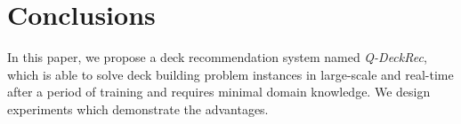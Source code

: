 

\section{Conclusions}\label{sec:conclusion}
In this paper, we propose a deck recommendation system named \textit{Q-DeckRec}, which is able to solve deck building problem instances in large-scale and real-time after a period of training and requires minimal domain knowledge. We design experiments which demonstrate the advantages.
